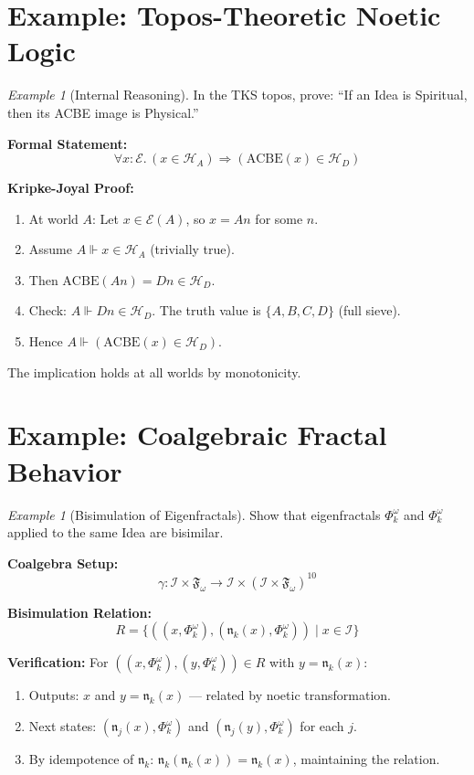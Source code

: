 \documentclass[11pt,twoside,openright]{book}
\theoremstyle{definition}
\theoremstyle{plain}
\theoremstyle{remark}
\newtheorem{example}[definition]{Example}
\newcommand{\Ideas}{\mathcal{I}}
\newcommand{\FracSet}{\mathfrak{F}}
\newcommand{\Hspace}{\mathcal{H}}
\newcommand{\TransFrac}[1]{\Phi^{#1}}        %
\begin{document}
\section{Example: Topos-Theoretic Noetic Logic}

\begin{example}[Internal Reasoning]
\label{ex:topos-reasoning}
In the TKS topos, prove: ``If an Idea is Spiritual, then its ACBE image is Physical.''

\textbf{Formal Statement:}
\[
\forall x : \mathcal{E}.\, (x \in \Hspace_A) \Rightarrow (\mathrm{ACBE}(x) \in \Hspace_D)
\]

\textbf{Kripke-Joyal Proof:}
\begin{enumerate}
  \item At world $A$: Let $x \in \mathcal{E}(A)$, so $x = An$ for some $n$.
  \item Assume $A \Vdash x \in \Hspace_A$ (trivially true).
  \item Then $\mathrm{ACBE}(An) = Dn \in \Hspace_D$.
  \item Check: $A \Vdash Dn \in \Hspace_D$. The truth value is $\{A, B, C, D\}$ (full sieve).
  \item Hence $A \Vdash (\mathrm{ACBE}(x) \in \Hspace_D)$.
\end{enumerate}
The implication holds at all worlds by monotonicity.
\end{example}

\section{Example: Coalgebraic Fractal Behavior}

\begin{example}[Bisimulation of Eigenfractals]
\label{ex:bisim-eigen}
Show that eigenfractals $\TransFrac{\omega}_k$ and $\TransFrac{\omega}_k$ applied to the same Idea are bisimilar.

\textbf{Coalgebra Setup:}
\[
\gamma : \Ideas \times \FracSet_\omega \to \Ideas \times (\Ideas \times \FracSet_\omega)^{10}
\]

\textbf{Bisimulation Relation:}
\[
R = \{((x, \TransFrac{\omega}_k), (\mathfrak{n}_k(x), \TransFrac{\omega}_k)) \mid x \in \Ideas\}
\]

\textbf{Verification:} For $((x, \TransFrac{\omega}_k), (y, \TransFrac{\omega}_k)) \in R$ with $y = \mathfrak{n}_k(x)$:
\begin{enumerate}
  \item Outputs: $x$ and $y = \mathfrak{n}_k(x)$ --- related by noetic transformation.
  \item Next states: $(\mathfrak{n}_j(x), \TransFrac{\omega}_k)$ and $(\mathfrak{n}_j(y), \TransFrac{\omega}_k)$ for each $j$.
  \item By idempotence of $\mathfrak{n}_k$: $\mathfrak{n}_k(\mathfrak{n}_k(x)) = \mathfrak{n}_k(x)$, maintaining the relation.
\end{enumerate}
\end{example}
\end{document}

